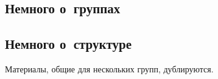 


\begingroup
\providecommand\ifsourcelinks{\iffalse}
\providecommand\url{\texttt}

\strut

\vfill

\begin{center}
\end{center}

\vfill

\strut

\clearpage


\subsection*{Немного о~группах}



\subsection*{Немного о~структуре}


Материалы, общие для нескольких групп, дублируются.
\ifsourcelinks
Все материалы сопровождаются ссылками на~исходные файлы \LaTeX.
\fi

\endgroup %

